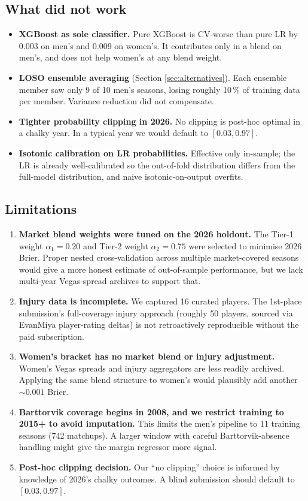 \documentclass[11pt, a4paper]{article}
\begin{document}
\subsection{What did not work}
\begin{itemize}[leftmargin=*]
    \item \textbf{XGBoost as sole classifier.} Pure XGBoost is CV-worse than pure LR by 0.003 on men's and 0.009 on women's. It contributes only in a blend on men's, and does not help women's at any blend weight.
    \item \textbf{LOSO ensemble averaging} (Section \ref{sec:alternatives}). Each ensemble member saw only 9 of 10 men's seasons, losing roughly 10\,\% of training data per member. Variance reduction did not compensate.
    \item \textbf{Tighter probability clipping in 2026.} No clipping is post-hoc optimal in a chalky year. In a typical year we would default to $[0.03, 0.97]$.
    \item \textbf{Isotonic calibration on LR probabilities.} Effective only in-sample; the LR is already well-calibrated so the out-of-fold distribution differs from the full-model distribution, and naive isotonic-on-output overfits.
\end{itemize}

\subsection{Limitations}
\label{sec:limitations}

\begin{enumerate}[leftmargin=*]
    \item \textbf{Market blend weights were tuned on the 2026 holdout.} The Tier-1 weight $\alpha_1 = 0.20$ and Tier-2 weight $\alpha_2 = 0.75$ were selected to minimise 2026 Brier. Proper nested cross-validation across multiple market-covered seasons would give a more honest estimate of out-of-sample performance, but we lack multi-year Vegas-spread archives to support that.
    \item \textbf{Injury data is incomplete.} We captured 16 curated players. The 1st-place submission's full-coverage injury approach (roughly 50 players, sourced via EvanMiya player-rating deltas) is not retroactively reproducible without the paid subscription.
    \item \textbf{Women's bracket has no market blend or injury adjustment.} Women's Vegas spreads and injury aggregators are less readily archived. Applying the same blend structure to women's would plausibly add another $\sim\!0.001$ Brier.
    \item \textbf{Barttorvik coverage begins in 2008, and we restrict training to 2015+ to avoid imputation.} This limits the men's pipeline to 11 training seasons (742 matchups). A larger window with careful Barttorvik-absence handling might give the margin regressor more signal.
    \item \textbf{Post-hoc clipping decision.} Our ``no clipping'' choice is informed by knowledge of 2026's chalky outcomes. A blind submission should default to $[0.03, 0.97]$.
\end{enumerate}
\end{document}
